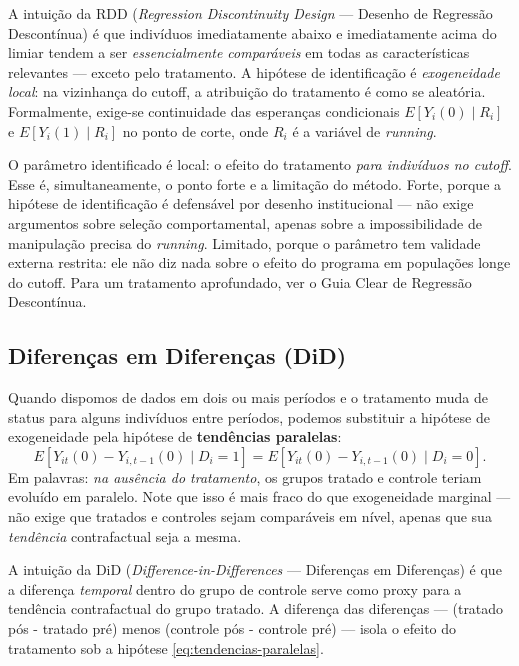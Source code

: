 A intuição da RDD (\textit{Regression Discontinuity Design} --- Desenho de Regressão Descontínua) é que indivíduos imediatamente abaixo e imediatamente acima do limiar tendem a ser \textit{essencialmente comparáveis} em todas as características relevantes --- exceto pelo tratamento. A hipótese de identificação é \textit{exogeneidade local}: na vizinhança do cutoff, a atribuição do tratamento é como se aleatória. Formalmente, exige-se continuidade das esperanças condicionais $E[Y_i(0) \mid R_i]$ e $E[Y_i(1) \mid R_i]$ no ponto de corte, onde $R_i$ é a variável de \textit{running}.

O parâmetro identificado é local: o efeito do tratamento \textit{para indivíduos no cutoff}. Esse é, simultaneamente, o ponto forte e a limitação do método. Forte, porque a hipótese de identificação é defensável por desenho institucional --- não exige argumentos sobre seleção comportamental, apenas sobre a impossibilidade de manipulação precisa do \textit{running}. Limitado, porque o parâmetro tem validade externa restrita: ele não diz nada sobre o efeito do programa em populações longe do cutoff. Para um tratamento aprofundado, ver o Guia Clear de Regressão Descontínua.

\subsection{Diferenças em Diferenças (DiD)}
\label{subsubsec:did}

Quando dispomos de dados em dois ou mais períodos e o tratamento muda de status para alguns indivíduos entre períodos, podemos substituir a hipótese de exogeneidade pela hipótese de \textbf{tendências paralelas}:
\begin{equation}
E[Y_{it}(0) - Y_{i, t-1}(0) \mid D_i = 1] = E[Y_{it}(0) - Y_{i, t-1}(0) \mid D_i = 0].
\label{eq:tendencias-paralelas}
\end{equation}
Em palavras: \textit{na ausência do tratamento}, os grupos tratado e controle teriam evoluído em paralelo. Note que isso é mais fraco do que exogeneidade marginal --- não exige que tratados e controles sejam comparáveis em nível, apenas que sua \textit{tendência} contrafactual seja a mesma.

A intuição da DiD (\textit{Difference-in-Differences} --- Diferenças em Diferenças) é que a diferença \textit{temporal} dentro do grupo de controle serve como proxy para a tendência contrafactual do grupo tratado. A diferença das diferenças --- (tratado pós - tratado pré) menos (controle pós - controle pré) --- isola o efeito do tratamento sob a hipótese \eqref{eq:tendencias-paralelas}.

